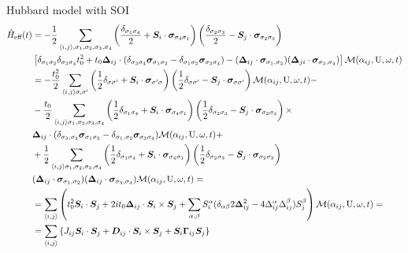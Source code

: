 \begin{section}{Hubbard model with SOI}
\begin{align*}
\hat{H}_{\text{eff}}(t) &= - \frac{1}{2} \sum_{\langle i,j \rangle, \sigma_1, \sigma_2, \sigma_3, \sigma_4} \left( \frac{\delta_{\sigma_1 \sigma_4}}{2} + \boldsymbol{S}_i\cdot\boldsymbol{\sigma}_{\sigma_4 \sigma_1} \right) \left( \frac{\delta_{\sigma_2 \sigma_3}}{2} - \boldsymbol{S}_j\cdot\boldsymbol{\sigma}_{\sigma_2 \sigma_3} \right) \nonumber \\ &\left[ \delta_{\sigma_1 \sigma_2}\delta_{\sigma_3 \sigma_4}t_0^2 + t_0\boldsymbol{\Delta}_{ij}\cdot(\delta_{\sigma_3 \sigma_4} \boldsymbol{\sigma}_{\sigma_1 \sigma_2} - \delta_{\sigma_1 \sigma_2} \boldsymbol{\sigma}_{\sigma_3 \sigma_4}) - (\boldsymbol{\Delta}_{ij}\cdot\boldsymbol{\sigma}_{\sigma_1, \sigma_2})(\boldsymbol{\Delta}_{ji}\cdot\boldsymbol{\sigma}_{\sigma_3, \sigma_4}) \right] \mathcal{M}(\alpha_{ij}, \text{U}, \omega, t) \\
&= -\frac{t_0^2}{2} \sum_{\langle i,j \rangle \sigma, \sigma'} \left(\frac{1}{2}\delta_{\sigma \sigma'} + \boldsymbol{S}_i\cdot\boldsymbol{\sigma}_{\sigma' \sigma}\right)\left(\frac{1}{2}\delta_{\sigma \sigma'}-\boldsymbol{S}_j\cdot\boldsymbol{\sigma}_{\sigma \sigma'}\right)\mathcal{M}(\alpha_{ij}, \text{U}, \omega, t) - \\
&- \frac{t_0}{2} \sum_{\langle i,j \rangle \sigma_1, \sigma_2, \sigma_3, \sigma_4} \left(\frac{1}{2}\delta_{\sigma_1 \sigma_4} + \boldsymbol{S}_i\cdot\boldsymbol{\sigma}_{\sigma_4 \sigma_1}\right)\left(\frac{1}{2}\delta_{\sigma_2 \sigma_3}-\boldsymbol{S}_j\cdot\boldsymbol{\sigma}_{\sigma_2 \sigma_3}\right) \times \\
&\boldsymbol{\Delta}_{ij}\cdot(\delta_{\sigma_3,\sigma_4}\boldsymbol{\sigma}_{\sigma_1 \sigma_2}-\delta_{\sigma_1,\sigma_2}\boldsymbol{\sigma}_{\sigma_3 \sigma_4})\mathcal{M}(\alpha_{ij}, \text{U}, \omega, t) + \\
&+\frac{1}{2}\sum_{\langle i,j \rangle \sigma_1, \sigma_2, \sigma_3, \sigma_4} \left(\frac{1}{2}\delta_{\sigma_1 \sigma_4} + \boldsymbol{S}_i\cdot\boldsymbol{\sigma}_{\sigma_4 \sigma_1}\right)\left(\frac{1}{2}\delta_{\sigma_2 \sigma_3}-\boldsymbol{S}_j\cdot\boldsymbol{\sigma}_{\sigma_2 \sigma_3}\right) \\
&(\boldsymbol{\Delta}_{ij}\cdot\boldsymbol{\sigma}_{\sigma_1, \sigma_2})(\boldsymbol{\Delta}_{ij}\cdot\boldsymbol{\sigma}_{\sigma_3, \sigma_4})\mathcal{M}(\alpha_{ij}, \text{U}, \omega, t) = \\
&= \sum_{\langle i,j \rangle} \left( t_0^2 \boldsymbol{S}_i\cdot\boldsymbol{S}_j + 2it_0\boldsymbol{\Delta}_{ij}\cdot \boldsymbol{S}_i \times \boldsymbol{S}_j + \sum_{\alpha, \beta} S_i^\alpha (\delta_{\alpha \beta} 2\boldsymbol{\Delta}_{ij}^2 - 4\Delta_{ij}^\alpha\Delta_{ij}^\beta ) S_j^\beta \right) \mathcal{M}(\alpha_{ij}, \text{U}, \omega, t) =\\
&= \sum_{\langle i,j \rangle} \left\{ J_{ij}\boldsymbol{S}_i\cdot\boldsymbol{S}_j +\boldsymbol{D}_{ij}\cdot\boldsymbol{S}_i \times \boldsymbol{S}_j + \boldsymbol{S}_i\boldsymbol{\Gamma}_{ij}\boldsymbol{S}_j \right\}
\end{align*}


\end{section}
